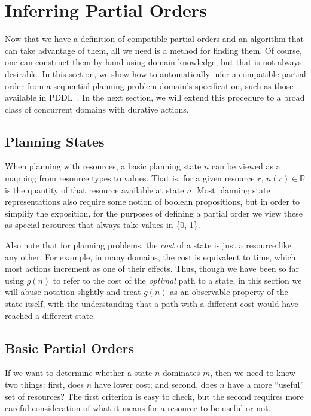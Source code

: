 \documentclass[letterpaper]{article}
\theoremstyle{plain} \newtheorem{theorem}{Theorem} \newtheorem{proposition}{Proposition} \newtheorem{lemma}{Lemma}
\theoremstyle{definition} \newtheorem{definition}{Definition} \newtheorem{conjecture}{Conjecture} \newtheorem*{example}{Example}
\theoremstyle{remark} \newtheorem*{remark}{Remark} \newtheorem*{note}{Note} \newtheorem{case}{Case}
\newcommand{\R}{\mathbb{R}}
\begin{document}
\section{Inferring Partial Orders}

\newcommand{\po}{\preceq_R}

Now that we have a definition of compatible partial orders and an
algorithm that can take advantage of them, all we need is a method
for finding them. Of course, one can construct them by hand using
domain knowledge, but that is not always desirable. In this section, we
show how to automatically infer a compatible partial order from a
sequential planning problem domain's specification, such as those
available in PDDL~\citep{ghallab1998pddl,fox2003pddl2}. In the next
section, we will extend this procedure to a broad class of concurrent
domains with durative actions.

\subsection{Planning States}

When planning with resources, a basic planning state $n$ can be viewed as a mapping from
resource types to values. That is, for a given resource $r$, $n(r) \in \R$ is the quantity
of that resource available at state $n$. Most planning state representations also require
some notion of boolean propositions, but in order to simplify the exposition, for the
purposes of defining a partial order we view these as special resources that always take
values in \{0, 1\}.

Also note that for planning problems, the \emph{cost} of a state is
just a resource like any other. For example, in many domains, the cost is equivalent to
time, which most actions increment as one of their effects. Thus, though we have been so
far using $g(n)$ to refer to the cost of the \emph{optimal} path to a state, in this
section we will abuse notation slightly and treat $g(n)$ as an observable property of the
state itself, with the understanding that a path with a different cost would have reached a
different state.

\subsection{Basic Partial Orders}

If we want to determine whether a state $n$ dominates $m$, then we need
to know two things: first, does $n$ have lower cost; and second, does $n$
have a more ``useful'' set of resources? The first criterion is easy to check, but the
second requires more careful consideration of what it means for a resource to be useful or not.
\end{document}
